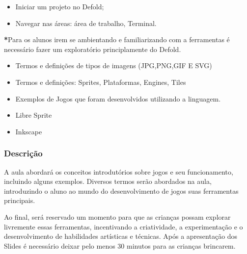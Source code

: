 \documentclass[letterpaper,10pt,brazil]{sphinxmanual}
\begin{document}
\sphinxAtStartPar
{}
\begin{itemize}
\item {} 
\sphinxAtStartPar
Iniciar um projeto no Defold;

\item {} 
\sphinxAtStartPar
Navegar nas áreas: área de trabalho, Terminal.

\end{itemize}

\sphinxAtStartPar
{\color{red}\bfseries{}*}Para os alunos irem se ambientando e familiarizando com a ferramentas é necessário fazer um exploratório
principlamente do Defold.

\sphinxAtStartPar
{}
\begin{itemize}
\item {} 
\sphinxAtStartPar
Termos e definições de tipos de imagens (JPG,PNG,GIF E SVG)

\item {} 
\sphinxAtStartPar
Termos e definições: Sprites, Plataformas, Engines, Tiles

\item {} 
\sphinxAtStartPar
Exemplos de Jogos que foram desenvolvidos utilizando a linguagem.

\end{itemize}

\sphinxAtStartPar
{}
\begin{itemize}
\item {} 
\sphinxAtStartPar
Libre Sprite

\item {} 
\sphinxAtStartPar
Inkscape

\end{itemize}
\subsubsection*{Descrição}

\sphinxAtStartPar
A aula abordará os conceitos introdutórios sobre jogos e seu funcionamento,
incluindo alguns exemplos. Diversos termos serão abordados na aula, introduzindo o aluno
ao mundo do desenvolvimento de jogos suas ferramentas principais.

\sphinxAtStartPar
Ao final, será reservado um momento para que as crianças possam explorar livremente essas ferramentas,
incentivando a criatividade, a experimentação e o desenvolvimento de habilidades artísticas e técnicas.
Após a apresentação dos Slides é necessário deixar pelo menos 30 minutos para as crianças brincarem.
\end{document}
